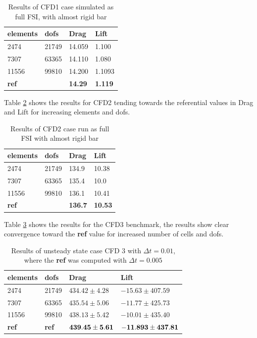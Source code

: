 \begin{table}[H]
\centering
\caption{Results of CFD1 case simulated as full FSI, with almost rigid bar}
\label{tab:CFD1}
\begin{tabular}{|l|l|l|l|}
\hline
\textbf{elements} & \textbf{dofs} & \textbf{Drag} & \textbf{Lift} \\ \hline
2474 & 21749 & 14.059 & 1.100 \\ \hline
7307 & 63365 & 14.110 & 1.080 \\ \hline
11556 & 99810 & 14.200 & 1.1093 \\ \hline
\textbf{ref} & \textbf{} & \textbf{14.29} & \textbf{1.119} \\ \hline
\end{tabular}
\end{table}

Table \ref{tab:CFD2} shows the results for CFD2 tending towards the referential values in Drag and Lift for increasing elements and dofs.

\begin{table}[H]
\centering
\caption{Results of CFD2 case run as full FSI with almost rigid bar}
\label{tab:CFD2}
\begin{tabular}{|l|l|l|l|}
\hline
\textbf{elements} & \textbf{dofs} & \textbf{Drag} & \textbf{Lift} \\ \hline
2474 & 21749 & 134.9 & 10.38 \\ \hline
7307 & 63365 & 135.4 & 10.0 \\ \hline
11556 & 99810 & 136.1 & 10.41 \\ \hline
\textbf{ref} & \textbf{} & \textbf{136.7} & \textbf{10.53} \\ \hline
\end{tabular}
\end{table}

Table \ref{CFD3_dt001} shows the results for the CFD3 benchmark, the results show clear convergence toward the \textbf{ref} value for increased number of cells and dofs.

\begin{table}[H]
\centering
\label{CFD3_dt001}
\begin{tabular}{|l|l|l|l|}
\hline
\textbf{elements} & \textbf{dofs} & \textbf{Drag} & \textbf{Lift} \\ \hline
2474 & 21749 & $434.42 \pm 4.28$ & $-15.63 \pm 407.59$ \\ \hline
7307 & 63365 & $435.54 \pm 5.06$ & $-11.77 \pm 425.73$ \\ \hline
11556 & 99810 & $438.13 \pm 5.42$ & $ -10.01 \pm 435.40 $ \\ \hline
\textbf{ref} & \textbf{ref} & $\bold{439.45} \pm \bold{5.61 }$ & $\bold{ -11.893} \pm \bold{437.81 }$ \\ \hline
\end{tabular}
\caption{Results of unsteady state case CFD 3 with $\Delta t = 0.01$, where the \textbf{ref} was computed with $\Delta t = 0.005$}
\end{table}

